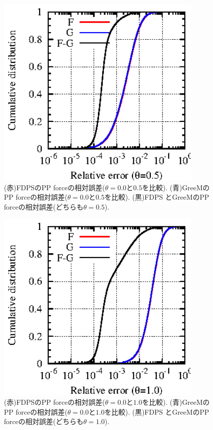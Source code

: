 \begin{figure}
  \begin{center}
    \includegraphics[width=10cm,bb=0 0 170 170]{fig/comparison_pt05.eps}
  \end{center}
  \caption{(赤)FDPSのPP forceの相対誤差($\theta=0.0$と$0.5$を比較).
    (青)GreeMのPP forceの相対誤差($\theta=0.0$と$0.5$を比較). (黒)FDPS
    とGreeMのPP forceの相対誤差(どちらも$\theta=0.5$).}
  \label{fig:comparison_pt05}
\end{figure}

\begin{figure}
  \begin{center}
    \includegraphics[width=10cm,bb=0 0 170 170]{fig/comparison_pt10.eps}
  \end{center}
  \caption{(赤)FDPSのPP forceの相対誤差($\theta=0.0$と$1.0$を比較).
    (青)GreeMのPP forceの相対誤差($\theta=0.0$と$1.0$を比較). (黒)FDPS
    とGreeMのPP forceの相対誤差(どちらも$\theta=1.0$).}
  \label{fig:comparison_pt10}
\end{figure}
